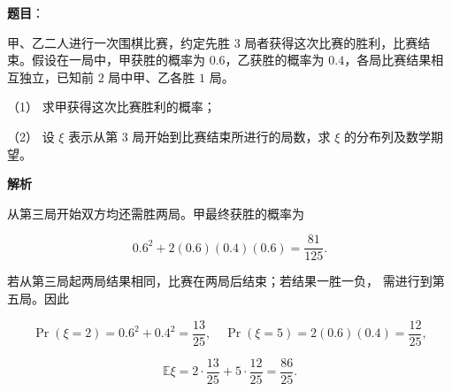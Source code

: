 \begin{answer}

\textbf{题目}：

甲、乙二人进行一次围棋比赛，约定先胜 $3$ 局者获得这次比赛的胜利，比赛结束。假设在一局中，甲获胜的概率为 $0.6$，乙获胜的概率为 $0.4$，各局比赛结果相互独立，已知前 $2$ 局中甲、乙各胜 $1$ 局。

（1） 求甲获得这次比赛胜利的概率；

（2） 设 $\xi$ 表示从第 $3$ 局开始到比赛结束所进行的局数，求 $\xi$ 的分布列及数学期望。

\textbf{解析}


从第三局开始双方均还需胜两局。甲最终获胜的概率为

\nopagebreak[4]
\[
0.6^2+2(0.6)(0.4)(0.6)=\frac{81}{125}.
\]


若从第三局起两局结果相同，比赛在两局后结束；若结果一胜一负，
需进行到第五局。因此

\nopagebreak[4]
\[
\Pr(\xi=2)=0.6^2+0.4^2=\frac{13}{25},\quad
\Pr(\xi=5)=2(0.6)(0.4)=\frac{12}{25},
\]

\nopagebreak[4]
\[
\mathbb E\xi=2\cdot\frac{13}{25}+5\cdot\frac{12}{25}
=\frac{86}{25}.
\]



\end{answer}
